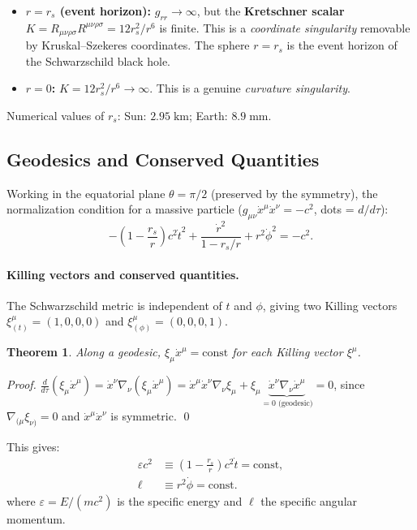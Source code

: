 \documentclass[12pt,a4paper]{article}
\theoremstyle{plain}
\newtheorem{theorem}{Theorem}[section]
\theoremstyle{definition}
\theoremstyle{remark}
\newcommand{\leff}{\ell}  %
\begin{document}
\begin{itemize}
  \item \textbf{$r=r_s$ (event horizon):} $g_{rr}\to\infty$, but the \textbf{Kretschner scalar}
    $K = R_{\mu\nu\rho\sigma}R^{\mu\nu\rho\sigma} = 12r_s^2/r^6$ is finite. This is a \textit{coordinate singularity} removable by Kruskal--Szekeres coordinates. The sphere $r=r_s$ is the event horizon of the Schwarzschild black hole.
  \item \textbf{$r=0$:} $K = 12r_s^2/r^6\to\infty$. This is a genuine \textit{curvature singularity}.
\end{itemize}

Numerical values of $r_s$: Sun: $2.95\;\mathrm{km}$; Earth: $8.9\;\mathrm{mm}$.

\subsection{Geodesics and Conserved Quantities}

Working in the equatorial plane $\theta=\pi/2$ (preserved by the symmetry), the normalization condition for a massive particle ($g_{\mu\nu}\dot x^\mu\dot x^\nu=-c^2$, dots = $d/d\tau$):
\[
  -\!\left(1-\frac{r_s}{r}\right)c^2\dot{t}^2 + \frac{\dot{r}^2}{1-r_s/r} + r^2\dot\phi^2 = -c^2.
\]

\paragraph{Killing vectors and conserved quantities.}

The Schwarzschild metric is independent of $t$ and $\phi$, giving two Killing vectors $\xi^\mu_{(t)} = (1,0,0,0)$ and $\xi^\mu_{(\phi)}=(0,0,0,1)$.

\begin{theorem}
Along a geodesic, $\xi_\mu\dot x^\mu = \mathrm{const}$ for each Killing vector $\xi^\mu$.
\end{theorem}
\begin{proof}
$\frac{d}{d\tau}(\xi_\mu\dot x^\mu) = \dot x^\nu\nabla_\nu(\xi_\mu\dot x^\mu) = \dot x^\mu\dot x^\nu\nabla_\nu\xi_\mu + \xi_\mu\underbrace{\dot x^\nu\nabla_\nu\dot x^\mu}_{=0\text{ (geodesic)}} = 0$, since $\nabla_{(\mu}\xi_{\nu)}=0$ and $\dot x^\mu\dot x^\nu$ is symmetric. \qed
\end{proof}

This gives:
\begin{align}
  \varepsilon c^2 &\equiv \left(1-\frac{r_s}{r}\right)c^2\dot{t} = \mathrm{const}, \label{eq:energy-GR}\\
  \leff &\equiv r^2\dot\phi = \mathrm{const.} \label{eq:angmom-GR}
\end{align}
where $\varepsilon = E/(mc^2)$ is the specific energy and $\leff$ the specific angular momentum.
\end{document}
